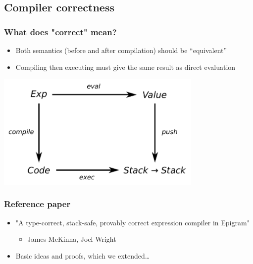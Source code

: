     \subsection{Compiler correctness}
        \begin{frame}
            \frametitle{What does "correct" mean?}

            \begin{itemize}
                \item Both semantics (before and after compilation) should be ``equivalent''
                \item Compiling then executing must give the same result as direct evaluation
            \end{itemize}

            \begin{center}
                \includegraphics[width=0.75\textwidth]{correctness.pdf}
            \end{center}
        \end{frame}

        \begin{frame}
            \frametitle{Reference paper}
            \begin{itemize}
                \item "A type-correct, stack-safe, provably correct expression compiler in Epigram"
                    \begin{itemize}
                        \item James McKinna, Joel Wright
                    \end{itemize}

                \item Basic ideas and proofs, which we extended\ldots
            \end{itemize}
        \end{frame}
    

